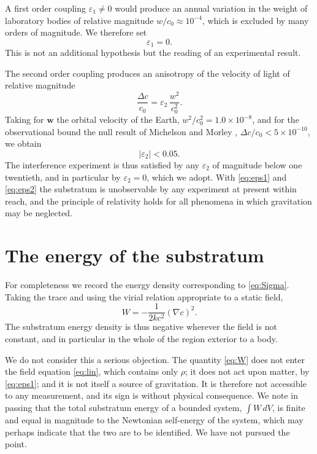 \documentclass[aps,prd,reprint,amsmath,amssymb,nofootinbib,longbibliography]{revtex4-2}
\begin{document}
A first order coupling $\varepsilon_1 \neq 0$ would produce an annual variation in the weight of
laboratory bodies of relative magnitude $w/c_0 \approx 10^{-4}$, which is excluded by many orders
of magnitude. We therefore set
\begin{equation}
\varepsilon_1 = 0 .
\label{eq:eps1}
\end{equation}
This is not an additional hypothesis but the reading of an experimental result.

The second order coupling produces an anisotropy of the velocity of light of relative magnitude
\begin{equation}
\frac{\Delta c}{c_0} = \varepsilon_2\, \frac{w^{2}}{c_0^{2}} .
\end{equation}
Taking for $\bm w$ the orbital velocity of the Earth, $w^{2}/c_0^{2} = 1.0 \times 10^{-8}$, and for
the observational bound the null result of Michelson and Morley \cite{mm1887},
$\Delta c/c_0 < 5 \times 10^{-10}$, we obtain
\begin{equation}
|\varepsilon_2| < 0.05 .
\label{eq:eps2}
\end{equation}
The interference experiment is thus satisfied by any $\varepsilon_2$ of magnitude below one
twentieth, and in particular by $\varepsilon_2 = 0$, which we adopt. With
\eqref{eq:eps1} and \eqref{eq:eps2} the substratum is unobservable by any experiment at present
within reach, and the principle of relativity holds for all phenomena in which gravitation may be
neglected.

\section{The energy of the substratum}

For completeness we record the energy density corresponding to \eqref{eq:Sigma}. Taking the trace
and using the virial relation appropriate to a static field,
\begin{equation}
W = -\frac{1}{2 k c^{2}} (\nabla c)^{2} .
\label{eq:W}
\end{equation}
The substratum energy density is thus negative wherever the field is not constant, and in
particular in the whole of the region exterior to a body.

We do not consider this a serious objection. The quantity \eqref{eq:W} does not enter the field
equation \eqref{eq:lin}, which contains only $\rho$; it does not act upon matter, by
\eqref{eq:eps1}; and it is not itself a source of gravitation. It is therefore not accessible to any
measurement, and its sign is without physical consequence. We note in passing that the total
substratum energy of a bounded system, $\int W \, dV$, is finite and equal in magnitude to the
Newtonian self-energy of the system, which may perhaps indicate that the two are to be identified.
We have not pursued the point.
\end{document}
